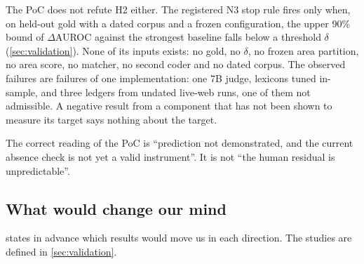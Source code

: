 The PoC does not refute H2 either. The registered N3 stop rule fires only when, on held-out gold
with a dated corpus and a frozen configuration, the upper 90\% bound of $\Delta$AUROC against the
strongest baseline falls below a threshold $\delta$ (\cref{sec:validation}). None of its inputs
exists: no gold, no $\delta$, no frozen area partition, no area score, no matcher, no second coder
and no dated corpus. The observed failures are failures of one implementation: one 7B judge, lexicons
tuned in-sample, and three ledgers from undated live-web runs, one of them not admissible. A negative
result from a component that has not been shown to measure its target says nothing about the target.

\begin{findingbox}
  The correct reading of the PoC is \enquote{prediction not demonstrated, and the current absence
  check is not yet a valid instrument}. It is not \enquote{the human residual is unpredictable}.
\end{findingbox}

\subsection{What would change our mind}\label{sec:interp-change}

 states in advance which results would move us in each direction. The studies
are defined in \cref{sec:validation}.

